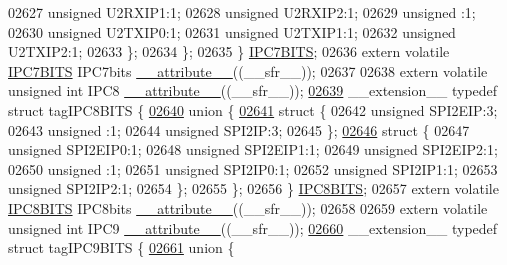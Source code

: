 \begin{DoxyCode}
02627       \textcolor{keywordtype}{unsigned} U2RXIP1:1;
02628       \textcolor{keywordtype}{unsigned} U2RXIP2:1;
02629       \textcolor{keywordtype}{unsigned} :1;
02630       \textcolor{keywordtype}{unsigned} U2TXIP0:1;
02631       \textcolor{keywordtype}{unsigned} U2TXIP1:1;
02632       \textcolor{keywordtype}{unsigned} U2TXIP2:1;
02633     \};
02634   \};
02635 \} \hyperlink{a00014_d0/dc2/a00564}{IPC7BITS};
02636 \textcolor{keyword}{extern} \textcolor{keyword}{volatile} \hyperlink{a00014_d0/dc2/a00564}{IPC7BITS} IPC7bits \hyperlink{a00015_a493c46f03454991ccc5aa7a6e1dfb2a7}{\_\_attribute\_\_}((\_\_sfr\_\_));
02637 
02638 \textcolor{keyword}{extern} \textcolor{keyword}{volatile} \textcolor{keywordtype}{unsigned} \textcolor{keywordtype}{int}  IPC8 \hyperlink{a00015_a493c46f03454991ccc5aa7a6e1dfb2a7}{\_\_attribute\_\_}((\_\_sfr\_\_));
\hypertarget{a00015_source_l02639}{}\hyperlink{a00014}{02639} \_\_extension\_\_ \textcolor{keyword}{typedef} \textcolor{keyword}{struct }tagIPC8BITS \{
\hypertarget{a00015_source_l02640}{}\hyperlink{a00015}{02640}   \textcolor{keyword}{union }\{
\hypertarget{a00015_source_l02641}{}\hyperlink{a00015}{02641}     \textcolor{keyword}{struct }\{
02642       \textcolor{keywordtype}{unsigned} SPI2EIP:3;
02643       \textcolor{keywordtype}{unsigned} :1;
02644       \textcolor{keywordtype}{unsigned} SPI2IP:3;
02645     \};
\hypertarget{a00015_source_l02646}{}\hyperlink{a00015}{02646}     \textcolor{keyword}{struct }\{
02647       \textcolor{keywordtype}{unsigned} SPI2EIP0:1;
02648       \textcolor{keywordtype}{unsigned} SPI2EIP1:1;
02649       \textcolor{keywordtype}{unsigned} SPI2EIP2:1;
02650       \textcolor{keywordtype}{unsigned} :1;
02651       \textcolor{keywordtype}{unsigned} SPI2IP0:1;
02652       \textcolor{keywordtype}{unsigned} SPI2IP1:1;
02653       \textcolor{keywordtype}{unsigned} SPI2IP2:1;
02654     \};
02655   \};
02656 \} \hyperlink{a00014_d2/dd7/a00567}{IPC8BITS};
02657 \textcolor{keyword}{extern} \textcolor{keyword}{volatile} \hyperlink{a00014_d2/dd7/a00567}{IPC8BITS} IPC8bits \hyperlink{a00015_a493c46f03454991ccc5aa7a6e1dfb2a7}{\_\_attribute\_\_}((\_\_sfr\_\_));
02658 
02659 \textcolor{keyword}{extern} \textcolor{keyword}{volatile} \textcolor{keywordtype}{unsigned} \textcolor{keywordtype}{int}  IPC9 \hyperlink{a00015_a493c46f03454991ccc5aa7a6e1dfb2a7}{\_\_attribute\_\_}((\_\_sfr\_\_));
\hypertarget{a00015_source_l02660}{}\hyperlink{a00014}{02660} \_\_extension\_\_ \textcolor{keyword}{typedef} \textcolor{keyword}{struct }tagIPC9BITS \{
\hypertarget{a00015_source_l02661}{}\hyperlink{a00015}{02661}   \textcolor{keyword}{union }\{

\end{DoxyCode}
